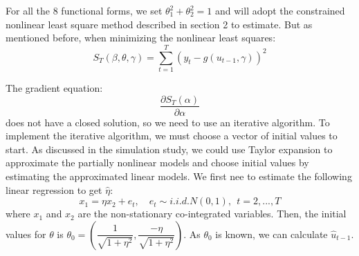 \documentclass[a4paper,12pt,times,numbered,print,index]{report}
\numberwithin{equation}{section}
\begin{document}
For all the 8 functional forms, we set $\theta^2_{1}+\theta_{2}^2 = 1$ and will adopt the constrained nonlinear least square method described in section 2 to estimate. But as mentioned before, when minimizing the nonlinear least squares:
$$
S_{T}(\beta, \theta, \gamma)=\sum_{t=1}^{T}\left(y_{t}-g\left(u_{t-1}, \gamma\right)\right)^{2}
$$

The gradient equation:
$$
\frac{\partial S_{T}(\alpha)}{\partial \alpha}
$$
does not have a closed solution, so we need to use an iterative algorithm. To implement the iterative algorithm, we must choose a vector of initial values to start. As discussed in the simulation study, we could use Taylor expansion to approximate the partially nonlinear models and choose initial values by estimating the approximated linear models. We first nee to estimate the following linear regression to get $\hat{\eta}$:
$$
x_1 = \eta x_2 + e_t, \quad e_{t}\sim i.i.d.N\left( 0,1\right) ,\ \ t=2,...,T
$$
where $x_1$ and $x_2$ are the non-stationary co-integrated variables. 
Then, the initial values for $\theta$ is $\theta_{0} = (\dfrac{1}{\sqrt{1+\eta^2}}, \dfrac{-\eta}{\sqrt{1+\eta^2}})$. 
As $\theta_{0}$ is known, we can calculate $\hat{u}_{t-1}$.
\end{document}
